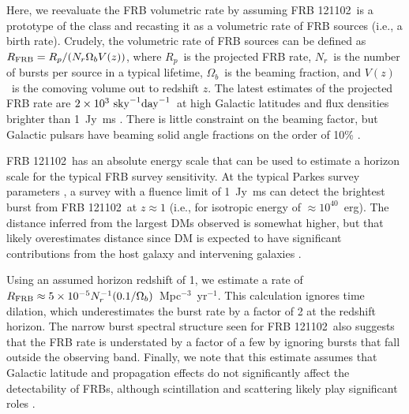 \documentclass[twocolumn]{aastex61}
\newcommand{\frb}{FRB 121102}
\begin{document}
Here, we reevaluate the FRB volumetric rate by assuming \frb\ is a prototype of the class and recasting it as a volumetric rate of FRB sources (i.e., a birth rate). Crudely, the volumetric rate of FRB sources can be defined as $R_{\rm{FRB}} = R_p /(N_r \Omega_b V (z))$, where $R_p$\ is the projected FRB rate, $N_r$\ is the number of bursts per source in a typical lifetime, $\Omega_b$\ is the beaming fraction, and $V(z)$\ is the comoving volume out to redshift $z$. The latest estimates of the projected FRB rate are $2\times10^3\ \rm{sky}^{-1} \rm{day}^{-1}$\ at high Galactic latitudes and flux densities brighter than 1~Jy~ms \citep{2016arXiv161100458L, 2016MNRAS.460L..30C, 2016MNRAS.455.2207R}. There is little constraint on the beaming factor, but Galactic pulsars have beaming solid angle fractions on the order of 10\% \citep{1998MNRAS.298..625T}.

\frb\ has an absolute energy scale that can be used to estimate a horizon scale for the typical FRB survey sensitivity. At the typical Parkes survey parameters \citep[e.g.,][]{2016MNRAS.460L..30C}, a survey with a fluence limit of 1~Jy~ms can detect the brightest burst from \frb\ at $z\approx1$ (i.e., for isotropic energy of $\approx10^{40}$~erg). The distance inferred from the largest DMs observed \citep[$\sim1500$\ pc cm$^{-3}$;][]{2016MNRAS.460L..30C} is somewhat higher, but that likely overestimates distance since DM is expected to have significant contributions from the host galaxy and intervening galaxies \citep{OPT, 2014ApJ...780L..33M}.

Using an assumed horizon redshift of 1, we estimate a rate of $R_{\rm{FRB}} \approx 5\times10^{-5} N_r^{-1} (0.1/\Omega_b)$\ Mpc$^{-3}$\ yr$^{-1}$. This calculation ignores time dilation, which underestimates the burst rate by a factor of 2 at the redshift horizon. The narrow burst spectral structure seen for \frb\ also suggests that the FRB rate is understated by a factor of a few by ignoring bursts that fall outside the observing band. Finally, we note that this estimate assumes that Galactic latitude and propagation effects do not significantly affect the detectability of FRBs, although scintillation and scattering likely play significant roles \citep{2015MNRAS.451.3278M, 2017arXiv170306580C}.
\end{document}
